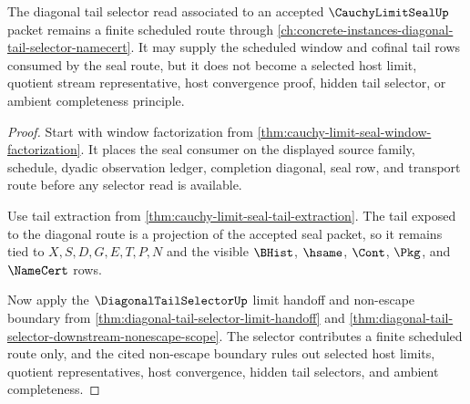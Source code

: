 \begin{theorem}
\label{thm:cauchy-limit-seal-diagonal-tail-selector-boundary}
The diagonal tail selector read associated to an accepted $\CauchyLimitSealUp$
packet remains a finite scheduled route through
\autoref{ch:concrete-instances-diagonal-tail-selector-namecert}. It may supply
the scheduled window and cofinal tail rows consumed by the seal route, but it
does not become a selected host limit, quotient stream representative, host
convergence proof, hidden tail selector, or ambient completeness principle.
\end{theorem}
\begin{proof}
Start with window factorization from
\autoref{thm:cauchy-limit-seal-window-factorization}. It places the seal
consumer on the displayed source family, schedule, dyadic observation ledger,
completion diagonal, seal row, and transport route before any selector read is
available.

Use tail extraction from \autoref{thm:cauchy-limit-seal-tail-extraction}. The
tail exposed to the diagonal route is a projection of the accepted seal packet,
so it remains tied to $X,S,D,G,E,T,P,N$ and the visible
$\BHist$, $\hsame$, $\Cont$, $\Pkg$, and $\NameCert$ rows.

Now apply the $\DiagonalTailSelectorUp$ limit handoff and non-escape boundary
from \autoref{thm:diagonal-tail-selector-limit-handoff} and
\autoref{thm:diagonal-tail-selector-downstream-nonescape-scope}. The selector
contributes a finite scheduled route only, and the cited non-escape boundary
rules out selected host limits, quotient representatives, host convergence,
hidden tail selectors, and ambient completeness.
\end{proof}

